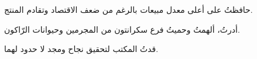 \begin{achievements}
	\item حافظتُ على أعلى معدل مبيعات بالرغم من ضعف الاقتصاد وتقادم المنتج.
	\item أدرتُ، ألهمتُ وحميتُ فرع سكرانتون من المجرمين وحيوانات الرّاكون.
	\item قدتُ المكتب لتحقيق نجاح ومجد لا حدود لهما.
\end{achievements}
